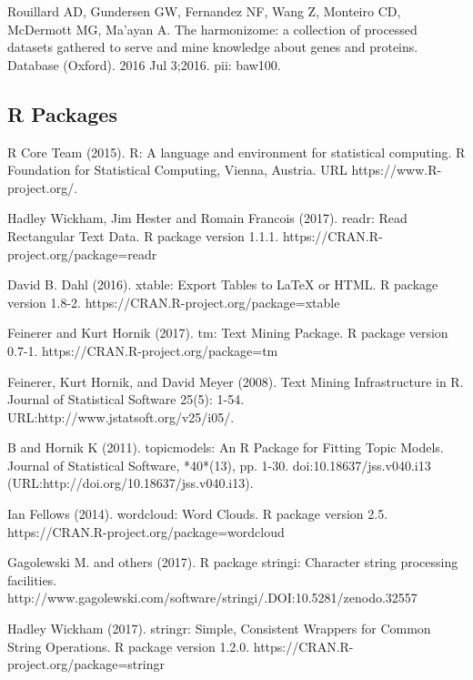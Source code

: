 \documentclass[preprint, 8pt]{elsarticle}
\theoremstyle{definition}
\begin{document}
\begin{thebibliography}{00}
 Rouillard AD, Gundersen GW, Fernandez NF, Wang Z, Monteiro CD, McDermott MG, Ma'ayan A. 
\newblock The harmonizome: a collection of processed datasets gathered to serve and mine knowledge about genes and proteins. 
\newblock Database (Oxford). 2016 Jul 3;2016. pii: baw100. 

\subsection{R Packages}

R Core Team (2015). 
\newblock R: A language and environment for statistical computing. R Foundation for Statistical Computing, Vienna, Austria.
\newblock URL https://www.R-project.org/.

 Hadley Wickham, Jim Hester and Romain Francois (2017). readr: Read
\newblock Rectangular Text Data. R package version 1.1.1.
\newblock https://CRAN.R-project.org/package=readr

 David B. Dahl (2016). 
\newblock xtable: Export Tables to LaTeX or HTML. R package version 1.8-2.
\newblock https://CRAN.R-project.org/package=xtable

  Feinerer and Kurt Hornik (2017).
\newblock tm: Text Mining Package. 
\newblock R package version 0.7-1. https://CRAN.R-project.org/package=tm

  Feinerer, Kurt Hornik, and David Meyer (2008). 
\newblock Text Mining Infrastructure in R. 
\newblock Journal of Statistical Software 25(5): 1-54. URL:http://www.jstatsoft.org/v25/i05/.

 B and Hornik K (2011).
\newblock topicmodels: An R Package for Fitting Topic Models.
\newblock Journal of Statistical Software, *40*(13), pp. 1-30. doi:10.18637/jss.v040.i13 (URL:http://doi.org/10.18637/jss.v040.i13).

 Ian Fellows (2014). 
\newblock wordcloud: Word Clouds. R package version 2.5.
\newblock https://CRAN.R-project.org/package=wordcloud

 Gagolewski M. and others (2017). 
\newblock R package stringi: Character string processing facilities. 
\newblock http://www.gagolewski.com/software/stringi/.DOI:10.5281/zenodo.32557

 Hadley Wickham (2017).
\newblock stringr: Simple, Consistent Wrappers for Common String Operations. 
\newblock R package version 1.2.0. https://CRAN.R-project.org/package=stringr


\end{thebibliography}
\end{document}
